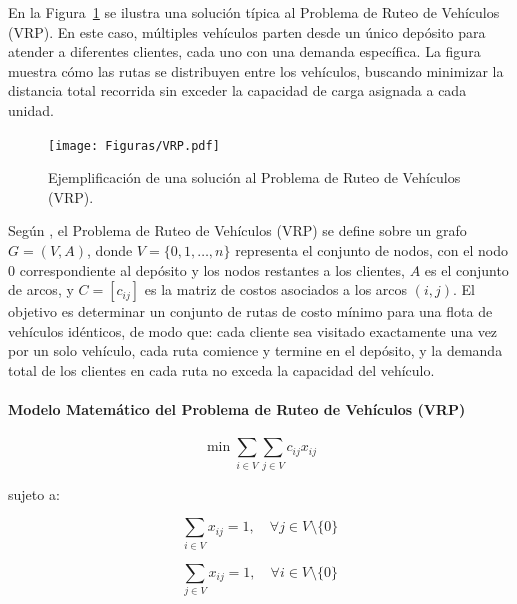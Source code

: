 \documentclass[12pt,titlepage,twoside,openright]{book}
\begin{document}
En la Figura~\ref{fig:vrp} se ilustra una solución típica al Problema de Ruteo de Vehículos (VRP). En este caso, múltiples vehículos parten desde un único depósito para atender a diferentes clientes, cada uno con una demanda específica. La figura muestra cómo las rutas se distribuyen entre los vehículos, buscando minimizar la distancia total recorrida sin exceder la capacidad de carga asignada a cada unidad.
\begin{figure}[H]
	\centering
	\texttt{[image: Figuras/VRP.pdf]}
	\caption{Ejemplificación de una solución al Problema de Ruteo de Vehículos (VRP).}
	\label{fig:vrp}
\end{figure}

Según \citep{toth2014}, el Problema de Ruteo de Vehículos (VRP) se define sobre un grafo $G = (V, A)$, donde $V = \{0, 1, \dots, n\}$ representa el conjunto de nodos, con el nodo $0$ correspondiente al depósito y los nodos restantes a los clientes, $A$ es el conjunto de arcos, y $C = [c_{ij}]$ es la matriz de costos asociados a los arcos $(i, j)$. El objetivo es determinar un conjunto de rutas de costo mínimo para una flota de vehículos idénticos, de modo que: cada cliente sea visitado exactamente una vez por un solo vehículo, cada ruta comience y termine en el depósito, y la demanda total de los clientes en cada ruta no exceda la capacidad del vehículo.

\paragraph{Modelo Matemático del Problema de Ruteo de Vehículos (VRP)}

\begin{equation}
	\min \sum_{i \in V} \sum_{j \in V} c_{ij} x_{ij}
	\label{eq:VRP_obj}
\end{equation}

sujeto a:

\begin{equation}
	\sum_{i \in V} x_{ij} = 1, \quad \forall j \in V \setminus \{0\}
	\label{eq:VRP_in}
\end{equation}

\begin{equation}
	\sum_{j \in V} x_{ij} = 1, \quad \forall i \in V \setminus \{0\}
	\label{eq:VRP_out}
\end{equation}
\end{document}
